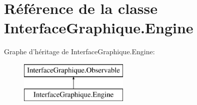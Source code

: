 \hypertarget{class_interface_graphique_1_1_engine}{\section{Référence de la classe Interface\-Graphique.\-Engine}
\label{class_interface_graphique_1_1_engine}
}
Graphe d'héritage de Interface\-Graphique.\-Engine\-:\begin{figure}[H]
\begin{center}
\leavevmode
\includegraphics[height=2.000000cm]{class_interface_graphique_1_1_engine}
\end{center}
\end{figure}
